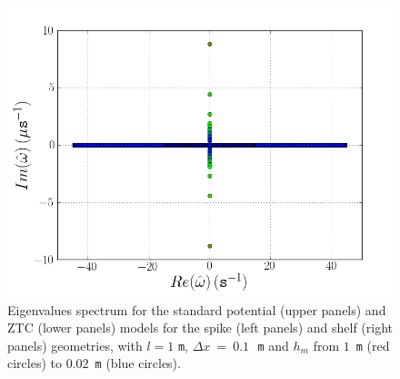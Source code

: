 \begin{figure}
\begin{center}
    \includegraphics[type=png,ext=.png,read=.png,width=\smallfig]{chapters/lopes/png/L_1_dx_0.1_hm_shelf_spectrum_Zhao}
  \end{center}
  \caption{Eigenvalues spectrum for the standard potential (upper
    panels) and ZTC (lower panels) models for the spike (left panels) and
    shelf (right panels) geometries, with $l=1$ {\tt m}, $\Delta
    x~=~0.1$\,~{\tt m} and $h_m$ from $1$~{\tt m} (red circles) to
    $0.02$~{\tt m} (blue circles).}
  \label{fig:lopes:spectrumhm2}
\end{figure}

